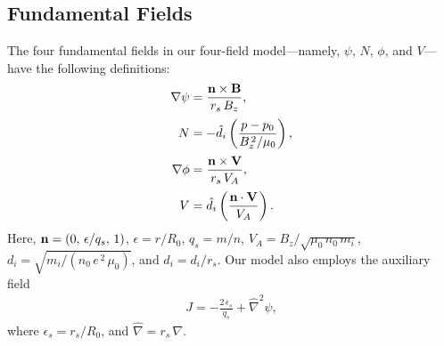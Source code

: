 \documentclass[12pt,prb,aps]{revtex4-1}
\begin{document}
\subsection{Fundamental Fields}
The four fundamental fields in our four-field model---namely, $\psi$, $N$, $\phi$, and $V$---have the following
definitions:
\begin{align}\label{e10}
\nabla\psi &= \frac{{\bf n}\times{\bf B}} {r_s\,B_z},\\[0.5ex]
N &=-\hat{d}_i\left(\frac{p-p_0}{B_z^{\,2}/\mu_0}\right),\\[0.5ex]
\nabla\phi &= \frac{{\bf n}\times {\bf V}}{r_s\,V_A},\\[0.5ex]
V &= \hat{d}_i\left(\frac{{\bf n}\cdot {\bf V}}{V_A}\right).\label{e13}
\end{align}
Here,   ${\bf n} = (0,\,\epsilon/q_s,\,1)$, $\epsilon = r/R_0$, $q_s=m/n$, 
$V_A =B_z/\sqrt{\mu_0\,n_0\,m_i}$, 
$d_i = \sqrt{m_i/(n_0\,e^{\,2}\,\mu_0)}$,
and $\hat{d}_i=d_i/r_s$. 
 Our
model also employs the auxiliary field
\begin{align}\label{e16}
J=-\frac{2\,\epsilon_s}{q_s}+\hat{\nabla}^2\psi,
\end{align}
where 
$\epsilon_s=r_s/R_0$, and $\hat{\nabla} = r_s\,\nabla$. 
\end{document}
